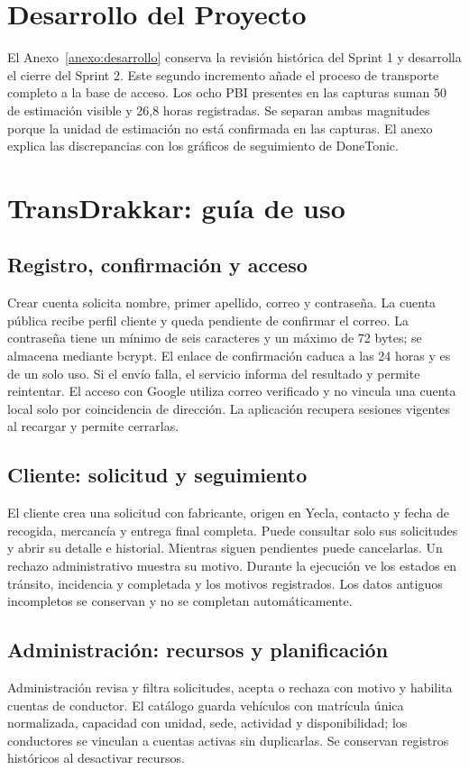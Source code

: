 \section{Desarrollo del Proyecto}
El Anexo~\ref{anexo:desarrollo} conserva la revisión histórica del Sprint 1 y desarrolla el cierre del Sprint 2. Este segundo incremento añade el proceso de transporte completo a la base de acceso. Los ocho PBI presentes en las capturas suman 50 de estimación visible y 26,8 horas registradas. Se separan ambas magnitudes porque la unidad de estimación no está confirmada en las capturas. El anexo explica las discrepancias con los gráficos de seguimiento de DoneTonic.

\section{TransDrakkar: guía de uso}
\subsection{Registro, confirmación y acceso}
Crear cuenta solicita nombre, primer apellido, correo y contraseña. La cuenta pública recibe perfil cliente y queda pendiente de confirmar el correo. La contraseña tiene un mínimo de seis caracteres y un máximo de 72 bytes; se almacena mediante bcrypt. El enlace de confirmación caduca a las 24 horas y es de un solo uso. Si el envío falla, el servicio informa del resultado y permite reintentar. El acceso con Google utiliza correo verificado y no vincula una cuenta local solo por coincidencia de dirección. La aplicación recupera sesiones vigentes al recargar y permite cerrarlas.

\subsection{Cliente: solicitud y seguimiento}
El cliente crea una solicitud con fabricante, origen en Yecla, contacto y fecha de recogida, mercancía y entrega final completa. Puede consultar solo sus solicitudes y abrir su detalle e historial. Mientras siguen pendientes puede cancelarlas. Un rechazo administrativo muestra su motivo. Durante la ejecución ve los estados en tránsito, incidencia y completada y los motivos registrados. Los datos antiguos incompletos se conservan y no se completan automáticamente.

\subsection{Administración: recursos y planificación}
Administración revisa y filtra solicitudes, acepta o rechaza con motivo y habilita cuentas de conductor. El catálogo guarda vehículos con matrícula única normalizada, capacidad con unidad, sede, actividad y disponibilidad; los conductores se vinculan a cuentas activas sin duplicarlas. Se conservan registros históricos al desactivar recursos.

